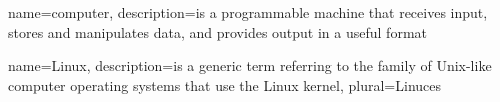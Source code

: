 {
  name=computer,
  description={is a programmable machine that receives input,
               stores and manipulates data, and provides
               output in a useful format}
}

{
  name=Linux,
  description={is a generic term referring to the family of Unix-like
               computer operating systems that use the Linux kernel},
  plural=Linuces
}
